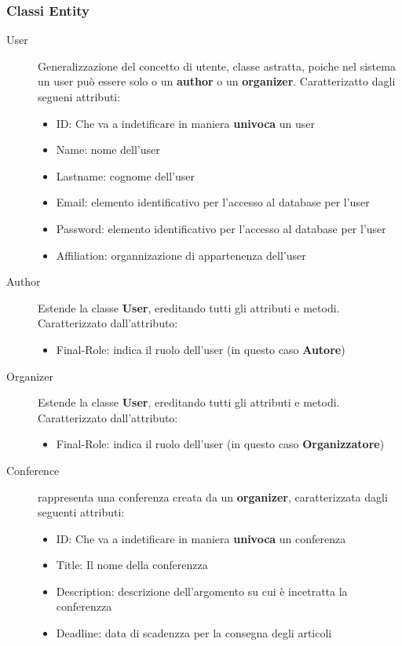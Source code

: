 \subsubsection{Classi Entity}
\begin{description}
\item [User] Generalizzazione del concetto di utente, classe astratta, poiche nel sistema un user può essere solo o un \textbf{author} o un \textbf{organizer}. Caratterizatto dagli segueni attributi:
\begin{itemize}
\item ID: Che va a indetificare in maniera \textbf{univoca} un user
\item Name: nome dell'user
\item Lastname: cognome dell'user
\item Email: elemento identificativo per l'accesso al database per l'user
\item Password:  elemento identificativo per l'accesso al database per l'user 
\item Affiliation: organnizazione di appartenenza dell'user
\end{itemize}
\item [Author] Estende la classe \textbf{User}, ereditando tutti gli attributi e metodi. Caratterizzato dall'attributo:
\begin{itemize}
\item Final-Role: indica il ruolo dell'user (in questo caso \textbf{Autore})
\end{itemize}
\item [Organizer] Estende la classe \textbf{User}, ereditando tutti gli attributi e metodi. Caratterizzato dall'attributo:
\begin{itemize}
\item Final-Role: indica il ruolo dell'user (in questo caso \textbf{Organizzatore}) 
\end{itemize}
\item [Conference] rappresenta una conferenza creata da un \textbf{organizer}, caratterizzata dagli seguenti attributi:
\begin{itemize}
\item ID: Che va a indetificare in maniera \textbf{univoca} un conferenza
\item Title: Il nome della conferenzza
\item Description: descrizione dell'argomento su cui è incetratta la conferenzza
\item Deadline: data di scadenzza per la consegna degli articoli

\end{itemize}
\end{description}
